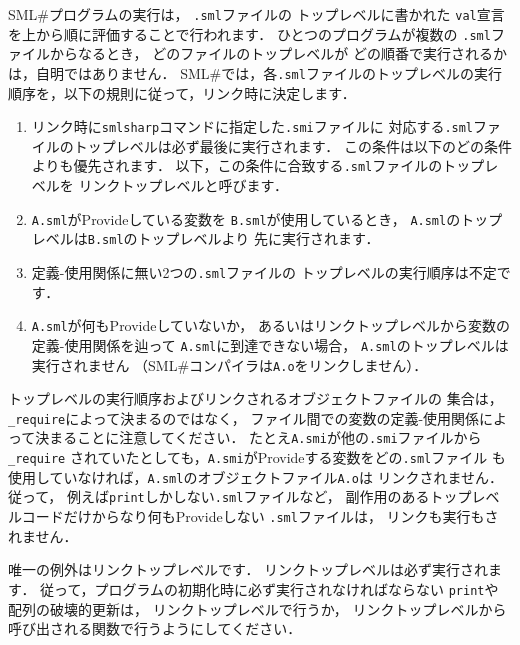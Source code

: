 \documentclass{jbook}
\newcommand{\smlsharp}{SML\#}
\begin{document}
\ifjp%
	\smlsharp{}プログラムの実行は，
{\tt .sml}ファイルの
トップレベルに書かれた
{\tt val}宣言を上から順に評価することで行われます．
	ひとつのプログラムが複数の
{\tt .sml}ファイルからなるとき，
どのファイルのトップレベルが
どの順番で実行されるかは，自明ではありません．
	\smlsharp{}では，各{\tt .sml}ファイルのトップレベルの実行
順序を，以下の規則に従って，リンク時に決定します．
\begin{enumerate}
\item
	リンク時に{\tt smlsharp}コマンドに指定した{\tt .smi}ファイルに
対応する{\tt .sml}ファイルのトップレベルは必ず最後に実行されます．
	この条件は以下のどの条件よりも優先されます．
	以下，この条件に合致する{\tt .sml}ファイルのトップレベルを
リンクトップレベルと呼びます．
\item
	{\tt A.sml}がProvideしている変数を
{\tt B.sml}が使用しているとき，
{\tt A.sml}のトップレベルは{\tt B.sml}のトップレベルより
先に実行されます．
\item
	定義-使用関係に無い2つの{\tt .sml}ファイルの
トップレベルの実行順序は不定です．
\item
	{\tt A.sml}が何もProvideしていないか，
あるいはリンクトップレベルから変数の定義-使用関係を辿って
{\tt A.sml}に到達できない場合，
{\tt A.sml}のトップレベルは実行されません
	（\smlsharp{}コンパイラは{\tt A.o}をリンクしません）．
\end{enumerate}
	トップレベルの実行順序およびリンクされるオブジェクトファイルの
集合は，{\tt \_require}によって決まるのではなく，
ファイル間での変数の定義-使用関係によって決まることに注意してください．
	たとえ{\tt A.smi}が他の{\tt .smi}ファイルから{\tt \_require}
されていたとしても，{\tt A.smi}がProvideする変数をどの{\tt .sml}ファイル
も使用していなければ，{\tt A.sml}のオブジェクトファイル{\tt A.o}は
リンクされません．
	従って，
例えば{\tt print}しかしない{\tt .sml}ファイルなど，
副作用のあるトップレベルコードだけからなり何もProvideしない
{\tt .sml}ファイルは，
リンクも実行もされません．

	唯一の例外はリンクトップレベルです．
	リンクトップレベルは必ず実行されます．
        従って，プログラムの初期化時に必ず実行されなければならない
{\tt print}や配列の破壊的更新は，
リンクトップレベルで行うか，
リンクトップレベルから呼び出される関数で行うようにしてください．
\end{document}
